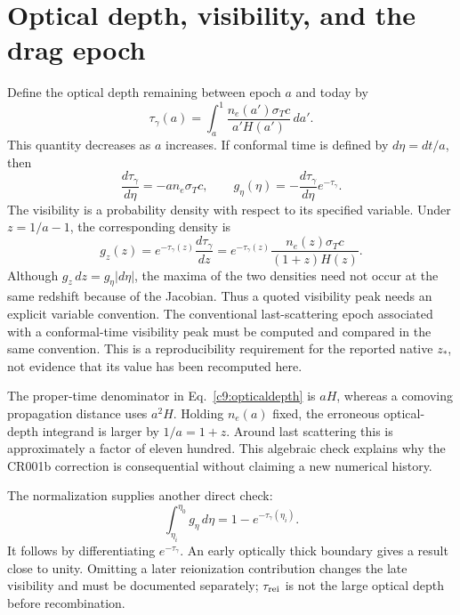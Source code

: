 \section{Optical depth, visibility, and the drag epoch}

Define the optical depth remaining between epoch $a$ and today by
\begin{equation}
 \tau_\gamma(a)=\int_a^1\frac{n_e(a')\sigma_Tc}{a'H(a')}\,da'.
 \label{c9:opticaldepth}
\end{equation}
This quantity decreases as $a$ increases. If conformal time is defined by $d\eta=dt/a$, then
\begin{equation}
 \frac{d\tau_\gamma}{d\eta}=-a n_e\sigma_Tc,
 \qquad g_\eta(\eta)=-\frac{d\tau_\gamma}{d\eta}e^{-\tau_\gamma}.
 \label{c9:visibility}
\end{equation}
The visibility is a probability density with respect to its specified variable. Under $z=1/a-1$, the corresponding density is
\begin{equation}
 g_z(z)=e^{-\tau_\gamma(z)}\frac{d\tau_\gamma}{dz}
 =e^{-\tau_\gamma(z)}\frac{n_e(z)\sigma_Tc}{(1+z)H(z)}.
 \label{c9:gzintegral}
\end{equation}
Although $g_z\,dz=g_\eta|d\eta|$, the maxima of the two densities need not occur at the same redshift because of the Jacobian. Thus a quoted visibility peak needs an explicit variable convention. The conventional last-scattering epoch associated with a conformal-time visibility peak must be computed and compared in the same convention. This is a reproducibility requirement for the reported native $z_*$, not evidence that its value has been recomputed here.

The proper-time denominator in Eq.~\eqref{c9:opticaldepth} is $aH$, whereas a comoving propagation distance uses $a^2H$. Holding $n_e(a)$ fixed, the erroneous optical-depth integrand is larger by $1/a=1+z$. Around last scattering this is approximately a factor of eleven hundred. This algebraic check explains why the CR001b correction is consequential without claiming a new numerical history.

The normalization supplies another direct check:
\begin{equation}
 \int_{\eta_i}^{\eta_0}g_\eta\,d\eta
 =1-e^{-\tau_\gamma(\eta_i)}.
 \label{c9:visibilitynorm}
\end{equation}
It follows by differentiating $e^{-\tau_\gamma}$. An early optically thick boundary gives a result close to unity. Omitting a later reionization contribution changes the late visibility and must be documented separately; $\tau_{\rm rei}$ is not the large optical depth before recombination.


